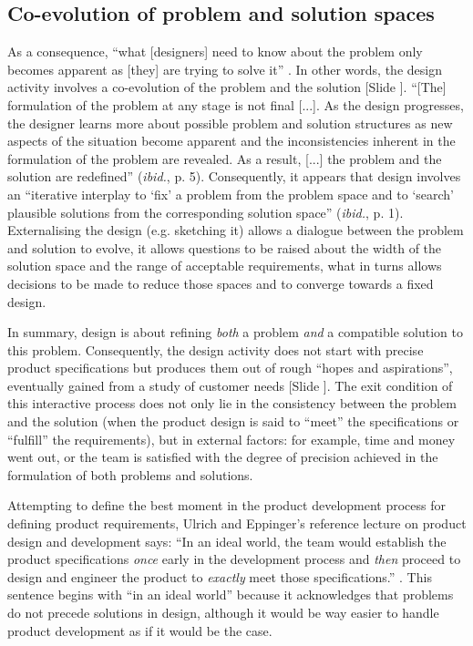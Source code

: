 \documentclass{article}
\newcounter{slide}
\begin{document}
\subsection{Co-evolution of problem and solution spaces}
\label{sec:coevolution}
As a consequence, ``what [designers] need to know about the problem only becomes apparent as [they] are trying to solve it'' \cite{cross2011design}. In other words, the design activity involves a co-evolution of the problem and the solution \cite{maherFormalisingDesignExploration1996} {\color{blue}[Slide ]}. ``[The] formulation of the problem at any stage is not final [...]. As the design progresses, the designer learns more about possible problem and solution structures as new aspects of the situation become apparent and the inconsistencies inherent in the formulation of the problem are revealed. As a result, [...] the problem and the solution are redefined'' (\emph{ibid.}, p. 5). Consequently, it appears that design involves an ``iterative interplay to `fix' a problem from the problem space and to `search' plausible solutions from the corresponding solution space'' (\emph{ibid.}, p. 1). Externalising the design (e.g. sketching it) allows a dialogue between the problem and solution to evolve, it allows questions to be raised about the width of the solution space and the range of acceptable requirements, what in turns allows decisions to be made to reduce those spaces and to converge towards a fixed design.

In summary, design is about refining \emph{both} a problem \emph{and} a compatible solution to this problem. Consequently, the design activity does not start with precise product specifications but produces them out of rough ``hopes and aspirations'', eventually gained from a study of customer needs \cite[p. 73]{ulrichProductDesignDevelopment2011} {\color{blue}[Slide ]}. The exit condition of this interactive process does not only lie in the consistency between the problem and the solution (when the product design is said to ``meet'' the specifications or ``fulfill'' the requirements), but in external factors: for example, time and money went out, or the team is satisfied with the degree of precision achieved in the formulation of both problems and solutions. 

Attempting to define the best moment in the product development process for defining product requirements, Ulrich and Eppinger's reference lecture on product design and development says: ``In an ideal world, the team would establish the product specifications \emph{once} early in the development process and \emph{then} proceed to design and engineer the product to \emph{exactly} meet those specifications.'' \cite[p. 73, emphases are not in the original text]{ulrichProductDesignDevelopment2011}. This sentence begins with ``in an ideal world'' because it acknowledges that problems do not precede solutions in design, although it would be way easier to handle product development as if it would be the case. 
\end{document}
